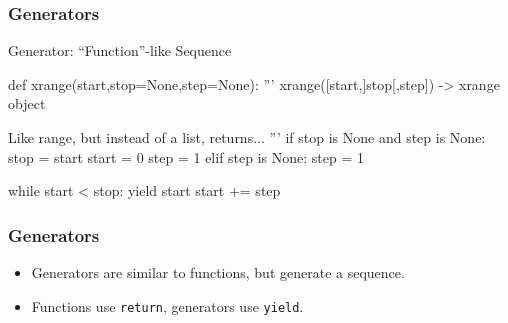 \begin{frame}[fragile]
\frametitle{Generators}

\begin{block}{Generator: ``Function''-like Sequence}

\begin{python}
def xrange(start,stop=None,step=None):
    '''
    xrange([start,]stop[,step]) -> xrange object

    Like range, but instead of a list, returns...
    '''
    if stop is None and step is None:
        stop = start
        start = 0
        step = 1
    elif step is None:
        step = 1

    while start < stop:
        yield start
        start += step
\end{python}
\end{block}

\end{frame}

\begin{frame}[fragile]
\frametitle{Generators}

\begin{itemize}
\item Generators are similar to functions, but generate a sequence.
\item Functions use \lstinline{return}, generators use \lstinline{yield}.
\end{itemize}
\end{frame}


